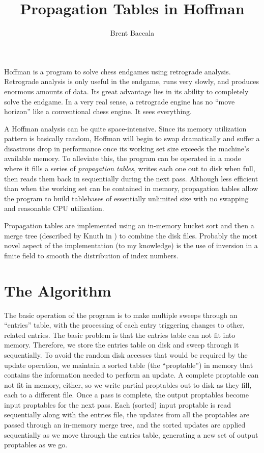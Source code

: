 \documentclass[11pt]{article}
\title{Propagation Tables in Hoffman}
\author{Brent Baccala}
\begin{document}
\maketitle

\parindent 0pt
\parskip 12pt

Hoffman is a program to solve chess endgames using retrograde
analysis.  Retrograde analysis is only useful in the endgame, runs
very slowly, and produces enormous amounts of data.  Its great
advantage lies in its ability to completely solve the endgame.  In a
very real sense, a retrograde engine has no ``move horizon'' like a
conventional chess engine.  It sees everything.

A Hoffman analysis can be quite space-intensive.  Since its
memory utilization pattern is basically random, Hoffman will begin to
swap dramatically and suffer a disastrous drop in performance once its
working set size exceeds the machine's available memory.  To alleviate
this, the program can be operated in a mode where it fills a series of
{\it propagation tables}, writes each one out to disk when full, then
reads them back in sequentially during the next pass.  Although less
efficient than when the working set can be contained in memory,
propagation tables allow the program to build tablebases of
essentially unlimited size with no swapping and reasonable CPU
utilization.

Propagation tables are implemented using an in-memory bucket sort and
then a merge tree (described by Knuth in \cite{knuth}) to combine the
disk files.  Probably the most novel aspect of the implementation (to
my knowledge) is the use of inversion in a finite field to smooth the
distribution of index numbers.

\section{The Algorithm}

The basic operation of the program is to make multiple sweeps through
an ``entries'' table, with the processing of each entry triggering
changes to other, related entries.  The basic problem is that the
entries table can not fit into memory.  Therefore, we store the
entries table on disk and sweep through it sequentially.  To avoid the
random disk accesses that would be required by the update operation,
we maintain a sorted table (the ``proptable'') in memory that contains
the information needed to perform an update.  A complete proptable can
not fit in memory, either, so we write partial proptables out to disk
as they fill, each to a different file.  Once a pass is complete, the
output proptables become input proptables for the next pass.  Each
(sorted) input proptable is read sequentially along with the entries
file, the updates from all the proptables are passed through an
in-memory merge tree, and the sorted updates are applied sequentially
as we move through the entries table, generating a new set of output
proptables as we go.
\end{document}
